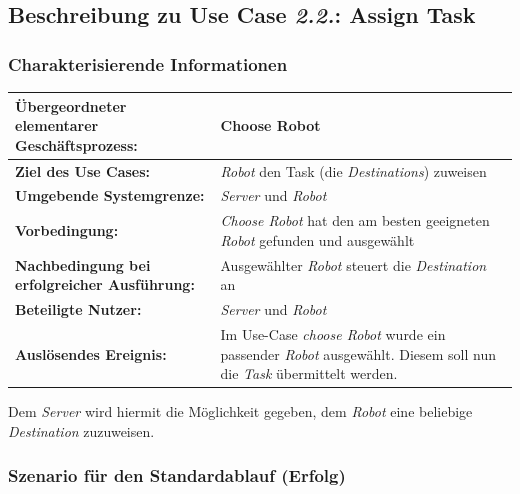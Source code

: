 				
				\pagebreak
				
			\subsection*{Beschreibung zu Use Case \emph{2.2.}: Assign Task}
				
				\subsubsection*{Charakterisierende Informationen}
				
				\begin{table}[H]
					\centering
					\begin{tabularx}{\textwidth}{|p{5cm}|X|}
						\hline
						\textbf{Übergeordneter elementarer Geschäftsprozess:} & Choose Robot  \\ \hline
						\textbf{Ziel des Use Cases:} & \emph{Robot} den Task (die \emph{Destinations}) zuweisen\\ \hline
						\textbf{Umgebende Systemgrenze:} & \emph{Server} und \emph{Robot} \\ \hline
						\textbf{Vorbedingung:} & \textit{ \glqq Choose Robot \grqq } hat den am besten geeigneten \emph{Robot} gefunden und ausgewählt\\ \hline
						\textbf{Nachbedingung bei erfolgreicher Ausführung:} & Ausgewählter \emph{Robot} steuert die \emph{Destination} an\\ \hline
						\textbf{Beteiligte Nutzer:} & \emph{Server} und \emph{Robot}\\ \hline
						\textbf{Auslösendes Ereignis:} & Im Use-Case \textit{ \glqq choose Robot \grqq } wurde ein passender \emph{Robot} ausgewählt. Diesem soll nun die \emph{Task} übermittelt werden. \\
						\hline
					\end{tabularx}
				\end{table}
				
				Dem \emph{Server} wird hiermit die Möglichkeit gegeben, dem \emph{Robot} eine beliebige \emph{Destination} zuzuweisen. 
				
				\subsubsection*{Szenario für den Standardablauf (Erfolg)}
				
